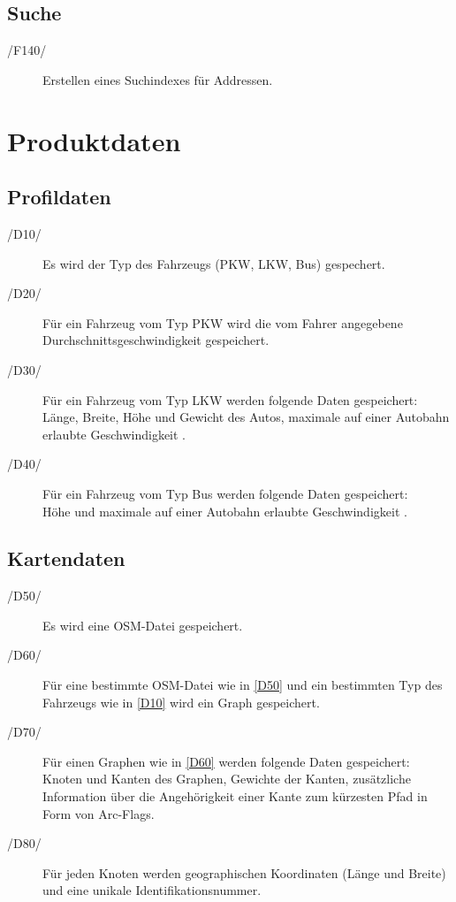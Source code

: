 \documentclass[a4paper, 11pt]{article}
\begin{document}
\subsection{Suche}
\begin{description}
\item[/F140/]
Erstellen eines Suchindexes für Addressen.

\end{description}
\section{Produktdaten}
\subsection{Profildaten}
\begin{description}
\item [/D10/\label{D10}]
Es wird der Typ des Fahrzeugs (PKW, LKW, Bus) gespechert.\\
\item [/D20/]
Für ein Fahrzeug vom Typ  PKW wird die vom Fahrer angegebene Durchschnittsgeschwindigkeit gespeichert.\\
\item [/D30/]
Für ein Fahrzeug vom Typ  LKW werden folgende Daten gespeichert:\\
Länge, Breite, Höhe und Gewicht des Autos, maximale auf einer Autobahn erlaubte Geschwindigkeit  .\\
\item [/D40/]
Für ein Fahrzeug vom Typ Bus werden folgende Daten gespeichert:\\
Höhe und maximale auf einer Autobahn erlaubte Geschwindigkeit  .\\
\end{description}

\subsection{Kartendaten}
\begin{description}
\item [/D50/\label{D50}]
Es wird eine OSM-Datei gespeichert.
\item [/D60/\label{D60}]
Für eine bestimmte OSM-Datei wie in \ref{D50} und ein bestimmten Typ des Fahrzeugs wie in \ref{D10} wird ein Graph gespeichert.
\item [/D70/]
Für einen Graphen wie in \ref{D60} werden  folgende Daten gespeichert:\\
Knoten und Kanten des Graphen, Gewichte der Kanten, zusätzliche Information über die Angehörigkeit einer Kante zum kürzesten Pfad in Form von Arc-Flags.
\item [/D80/]
Für jeden Knoten werden geographischen Koordinaten (Länge und Breite) und eine unikale Identifikationsnummer.
\end{description}
\end{document}
